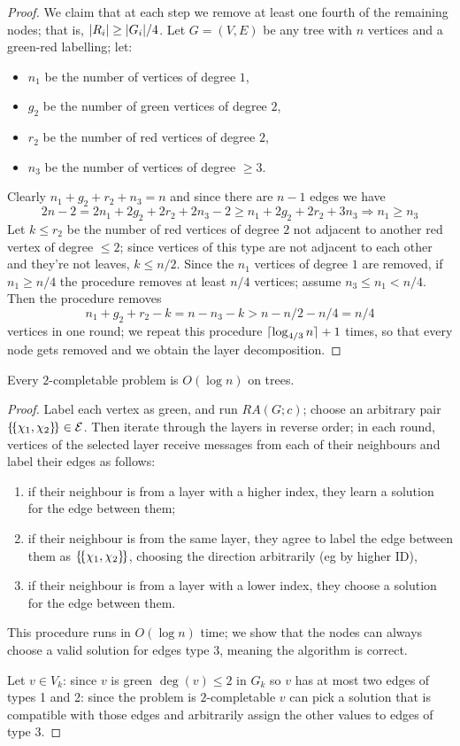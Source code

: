 \documentclass[12pt,a4paper]{article}
\begin{document}
\begin{proof}
    We claim that at each step we remove at least one fourth of the remaining nodes; that is, $\lvert R_i\rvert\geq\lvert G_i\rvert/4$. Let $G=(V,E)$ be any tree with $n$ vertices and a green-red labelling; let:
    \begin{itemize}
        \item $n_1$ be the number of vertices of degree $1$,
        \item $g_2$ be the number of green vertices of degree $2$,
        \item $r_2$ be the number of red vertices of degree $2$,
        \item $n_3$ be the number of vertices of degree $\geq 3$.
    \end{itemize}
    Clearly $n_1+g_2+r_2+n_3=n$ and since there are $n-1$ edges we have 
    $$2n-2=2n_1+2g_2+2r_2+2n_3-2\geq n_1+2g_2+2r_2+3n_3\Rightarrow n_1\geq n_3$$
    Let $k\leq r_2$ be the number of red vertices of degree $2$ not adjacent to another red vertex of degree $\leq 2$; since vertices of this type are not adjacent to each other and they're not leaves, $k\leq n/2$. Since the $n_1$ vertices of degree $1$ are removed, if $n_1\geq n/4$ the procedure removes at least $n/4$ vertices; assume $n_3\leq n_1<n/4$. Then the procedure removes
    $$n_1+g_2+r_2-k=n-n_3-k>n-n/2-n/4=n/4$$
    vertices in one round; we repeat this procedure $\lceil\log_{4/3}n\rceil+1$ times, so that every node gets removed and we obtain the layer decomposition.
\end{proof}
\begin{lem}\label{lem:2comp}
    Every $2$-completable problem is $O(\log n)$ on trees.
\end{lem}
\begin{proof}
    Label each vertex as green, and run $RA(G;c)$; choose an arbitrary pair $\left\lbrace \! \left\lbrace\chi_1,\chi_2\right\rbrace \! \right\rbrace\in\mathcal{E}$. Then iterate through the layers in reverse order; in each round, vertices of the selected layer receive messages from each of their neighbours and label their edges as follows:
    \begin{enumerate}
        \item if their neighbour is from a layer with a higher index, they learn a solution for the edge between them; 
        \item if their neighbour is from the same layer, they agree to label the edge between them as $\left\lbrace \! \left\lbrace\chi_1,\chi_2\right\rbrace \! \right\rbrace$, choosing the direction arbitrarily (eg by higher ID),
        \item if their neighbour is from a layer with a lower index, they choose a solution for the edge between them.
    \end{enumerate}
    This procedure runs in $O(\log n)$ time; we show that the nodes can always choose a valid solution for edges type 3, meaning the algorithm is correct.
    
    Let $v\in V_k$: since $v$ is green $\deg(v)\leq 2$ in $G_k$ so $v$ has at most two edges of types 1 and 2: since the problem is $2$-completable $v$ can pick a solution that is compatible with those edges and arbitrarily assign the other values to edges of type 3.
\end{proof}
\end{document}
